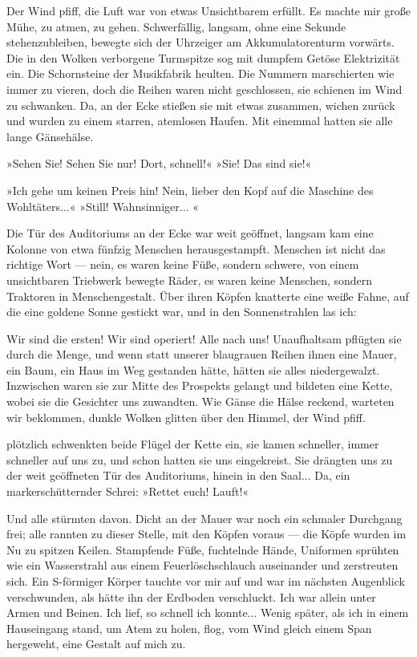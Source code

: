 Der Wind pfiff, die Luft war von etwas Unsichtbarem erfüllt. Es
machte mir große Mühe, zu atmen, zu gehen. Schwerfällig, langsam,
ohne eine Sekunde stehenzubleiben, bewegte sich der Uhrzeiger am
Akkumulatorenturm vorwärts. Die in den Wolken verborgene Turmspitze
sog mit dumpfem Getöse Elektrizität ein. Die Schornsteine der
Musikfabrik heulten. Die Nummern marschierten wie immer zu vieren,
doch die Reihen waren nicht geschlossen, sie schienen im Wind zu
schwanken. Da, an der Ecke stießen sie mit etwas zusammen, wichen
zurück und wurden zu einem starren, atemlosen Haufen. Mit einemmal
hatten sie alle lange Gänsehälse.

»Sehen Sie! Sehen Sie nur! Dort, schnell!« »Sie! Das sind sie!«

»Ich gehe um keinen Preis hin! Nein, lieber den Kopf auf die
Maschine des Wohltäters...« »Still! Wahnsinniger... «

Die Tür des Auditoriums an der Ecke war weit geöffnet, langsam kam
eine Kolonne von etwa fünfzig Menschen herausgestampft. Menschen
ist nicht das richtige Wort — nein, es waren keine Füße, sondern
schwere, von einem unsichtbaren Triebwerk bewegte Räder, es waren
keine Menschen, sondern Traktoren in Menschengestalt. Über ihren
Köpfen knatterte eine weiße Fahne, auf die eine goldene Sonne
gestickt war, und in den Sonnenstrahlen las ich:

Wir sind die ersten! Wir sind operiert! Alle nach uns! Unaufhaltsam
pflügten sie durch die Menge, und wenn statt unserer blaugrauen
Reihen ihnen eine Mauer, ein Baum, ein Haus im Weg gestanden hätte,
hätten sie alles niedergewalzt. Inzwischen waren sie zur Mitte des
Prospekts gelangt und bildeten eine Kette, wobei sie die Gesichter
uns zuwandten. Wie Gänse die Hälse reckend, warteten wir beklommen,
dunkle Wolken glitten über den Himmel, der Wind pfiff.

plötzlich schwenkten beide Flügel der Kette ein, sie kamen
schneller, immer schneller auf uns zu, und schon hatten sie uns
eingekreist. Sie drängten uns zu der weit geöffneten Tür des
Auditoriums, hinein in den Saal... Da, ein markerschütternder
Schrei: »Rettet euch! Lauft!«

Und alle stürmten davon. Dicht an der Mauer war noch ein schmaler
Durchgang frei; alle rannten zu dieser Stelle, mit den Köpfen
voraus — die Köpfe wurden im Nu zu spitzen Keilen. Stampfende Füße,
fuchtelnde Hände, Uniformen sprühten wie ein Wasserstrahl aus einem
Feuerlöschschlauch auseinander und zerstreuten sich. Ein S-förmiger
Körper tauchte vor mir auf und war im nächsten Augenblick
verschwunden, als hätte ihn der Erdboden verschluckt. Ich war
allein unter Armen und Beinen. Ich lief, so schnell ich konnte...
Wenig später, als ich in einem Hauseingang stand, um Atem zu holen,
flog, vom Wind gleich einem Span hergeweht, eine Gestalt auf mich
zu.

